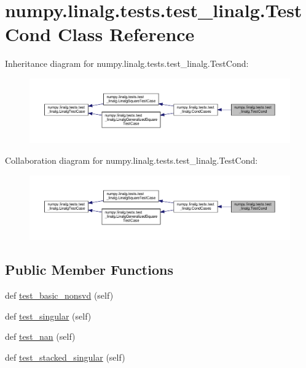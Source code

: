 \hypertarget{classnumpy_1_1linalg_1_1tests_1_1test__linalg_1_1TestCond}{}\section{numpy.\+linalg.\+tests.\+test\+\_\+linalg.\+Test\+Cond Class Reference}
\label{classnumpy_1_1linalg_1_1tests_1_1test__linalg_1_1TestCond}


Inheritance diagram for numpy.\+linalg.\+tests.\+test\+\_\+linalg.\+Test\+Cond\+:
\nopagebreak
\begin{figure}[H]
\begin{center}
\leavevmode
\includegraphics[width=350pt]{classnumpy_1_1linalg_1_1tests_1_1test__linalg_1_1TestCond__inherit__graph}
\end{center}
\end{figure}


Collaboration diagram for numpy.\+linalg.\+tests.\+test\+\_\+linalg.\+Test\+Cond\+:
\nopagebreak
\begin{figure}[H]
\begin{center}
\leavevmode
\includegraphics[width=350pt]{classnumpy_1_1linalg_1_1tests_1_1test__linalg_1_1TestCond__coll__graph}
\end{center}
\end{figure}
\subsection*{Public Member Functions}
\begin{DoxyCompactItemize}
\item 
def \hyperlink{classnumpy_1_1linalg_1_1tests_1_1test__linalg_1_1TestCond_a4118e2ff945837d675b54166745f8355}{test\+\_\+basic\+\_\+nonsvd} (self)
\item 
def \hyperlink{classnumpy_1_1linalg_1_1tests_1_1test__linalg_1_1TestCond_a0e26d505324fe5504f345ff6cccecddb}{test\+\_\+singular} (self)
\item 
def \hyperlink{classnumpy_1_1linalg_1_1tests_1_1test__linalg_1_1TestCond_ac15aeb427116aa7fe7eea0820f31b595}{test\+\_\+nan} (self)
\item 
def \hyperlink{classnumpy_1_1linalg_1_1tests_1_1test__linalg_1_1TestCond_a0c848f38421bdf21837c77669f5d339c}{test\+\_\+stacked\+\_\+singular} (self)
\end{DoxyCompactItemize}
